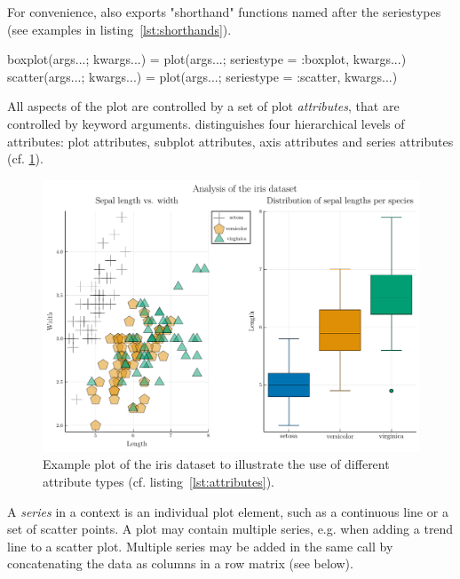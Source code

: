 \documentclass[a4paper]{article}
\begin{document}
For convenience, \Plots also exports "shorthand" functions named after the seriestypes (see examples in listing~\ref{lst:shorthands}).
\pagebreak
%
\begin{code}[caption=Examples of shorthands. Full list available at \url{https://docs.juliaplots/stable/api/\#Plot-specification}., label=lst:shorthands]
boxplot(args...; kwargs...) = plot(args...; seriestype = :boxplot, kwargs...)
scatter(args...; kwargs...) = plot(args...; seriestype = :scatter, kwargs...)
\end{code}

All aspects of the plot are controlled by a set of plot \emph{attributes}, that are controlled by keyword arguments\cite{OverviewPlots}.
\Plots distinguishes four hierarchical levels of attributes: plot attributes, subplot attributes, axis attributes and series attributes (cf. \cref{fig:attributes}).

\begin{figure}
    \centering
    \includegraphics[width=\linewidth]{./fig/attributes}
    \caption{Example plot of the iris dataset\cite{UCIMachineLearning} to illustrate the use of different attribute types (cf. listing~\ref{lst:attributes}).}
    \label{fig:attributes}
\end{figure}
%

A \emph{series} in a \Plots context is an individual plot element, such as a continuous line or a set of scatter points.
A plot may contain multiple series, e.g. when adding a trend line to a scatter plot.
Multiple series may be added in the same  call by concatenating the data as columns in a row matrix (see below).
\end{document}
